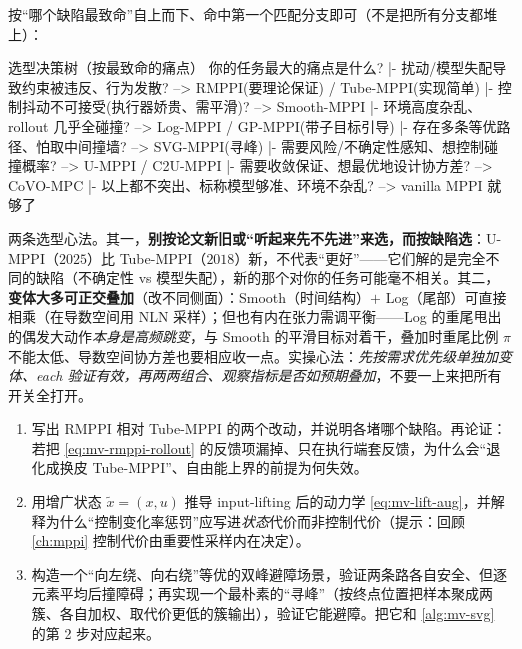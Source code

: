 \begin{algo}[选型决策树]\label{alg:mv-decision}
按“哪个缺陷最致命”自上而下、命中第一个匹配分支即可（不是把所有分支都堆上）：
\end{algo}

\begin{codebox}[text]{选型决策树（按最致命的痛点）}
你的任务最大的痛点是什么?
|- 扰动/模型失配导致约束被违反、行为发散? --> RMPPI(要理论保证) / Tube-MPPI(实现简单)
|- 控制抖动不可接受(执行器娇贵、需平滑)?   --> Smooth-MPPI
|- 环境高度杂乱、rollout 几乎全碰撞?       --> Log-MPPI / GP-MPPI(带子目标引导)
|- 存在多条等优路径、怕取中间撞墙?         --> SVG-MPPI(寻峰)
|- 需要风险/不确定性感知、想控制碰撞概率?   --> U-MPPI / C2U-MPPI
|- 需要收敛保证、想最优地设计协方差?       --> CoVO-MPC
|- 以上都不突出、标称模型够准、环境不杂乱?  --> vanilla MPPI 就够了
\end{codebox}

\begin{insight}
两条选型心法。其一，\textbf{别按论文新旧或“听起来先不先进”来选，而按缺陷选}：U-MPPI（$2025$）比 Tube-MPPI（$2018$）新，不代表“更好”——它们解的是完全不同的缺陷（不确定性 vs 模型失配），新的那个对你的任务可能毫不相关。其二，\textbf{变体大多可正交叠加}（改不同侧面）：Smooth（时间结构）$+$ Log（尾部）可直接相乘（在导数空间用 NLN 采样）；但也有内在张力需调平衡——Log 的重尾甩出的偶发大动作\emph{本身是高频跳变}，与 Smooth 的平滑目标对着干，叠加时重尾比例 $\pi$ 不能太低、导数空间协方差也要相应收一点。实操心法：\emph{先按需求优先级单独加变体、each 验证有效，再两两组合、观察指标是否如预期叠加}，不要一上来把所有开关全打开。
\end{insight}

\begin{practice}
\begin{enumerate}
  \item 写出 RMPPI 相对 Tube-MPPI 的两个改动，并说明各堵哪个缺陷。再论证：若把 \cref{eq:mv-rmppi-rollout} 的反馈项漏掉、只在执行端套反馈，为什么会“退化成换皮 Tube-MPPI”、自由能上界的前提为何失效。
  \item 用增广状态 $\tilde x=(x,u)$ 推导 input-lifting 后的动力学 \cref{eq:mv-lift-aug}，并解释为什么“控制变化率惩罚”应写进\emph{状态}代价而非控制代价（提示：回顾 \cref{ch:mppi} 控制代价由重要性采样内在决定）。
  \item 构造一个“向左绕、向右绕”等优的双峰避障场景，验证两条路各自安全、但逐元素平均后撞障碍；再实现一个最朴素的“寻峰”（按终点位置把样本聚成两簇、各自加权、取代价更低的簇输出），验证它能避障。把它和 \cref{alg:mv-svg} 的第 2 步对应起来。
\end{enumerate}
\end{practice}

